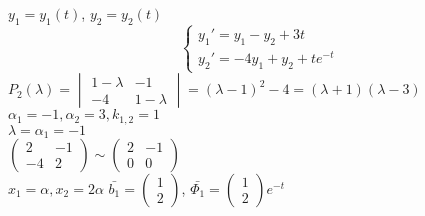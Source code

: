 \begin{Example}[алгебраическая]
    $y_1=y_1(t)$, $y_2=y_2(t)$\\
    \[\begin{cases}
    y_1'=y_1-y_2+3t\\
    y_2'=-4y_1+y_2+t e^{-t}
    \end{cases}\]
    $P_2(\lambda)=\begin{vmatrix} 1-\lambda & -1\\ -4 & 1-\lambda\end{vmatrix}=(\lambda-1)^2-4=(\lambda+1)(\lambda-3)$\\
    $\alpha_1=-1, \alpha_2=3, k_{1,2}=1$\\
    $\lambda=\alpha_1=-1$\\
    $\begin{pmatrix} 2 & -1\\ -4 & 2\end{pmatrix}\sim \begin{pmatrix} 2 & -1\\ 0 & 0\end{pmatrix}$\\
    $x_1=\alpha, x_2=2\alpha$ $\bar{b_1}=\begin{pmatrix} 1\\  2\end{pmatrix}$, $\bar{\Phi_1}=\begin{pmatrix} 1\\  2\end{pmatrix}e^{-t}$\\


\end{Example}
